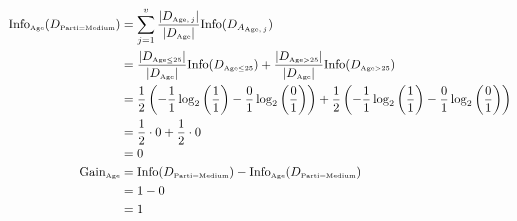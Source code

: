 \documentclass[
english,
smallborders
]{i6prcsht}
\newcommand{\OfSpecificValue}[3]{_{\text{\tiny #1#2#3}}}
\newcommand{\OfAttribute}[1]{_{\text{\tiny #1}}}
\begin{document}
\begin{solution}
\begin{enumerate}
\begin{enumerate}
\begin{enumerate}
\begin{enumerate}
					                        \begin{alignat*}{2}
						                        \text{Info}\OfAttribute{Age}(D\OfSpecificValue{Parti}{=}{Medium}) & = \sum_{j=1}^v \frac{|D\OfAttribute{Age$,j$}|}{|D\OfAttribute{Age}|} \text{Info}(D_{A\OfAttribute{Age$,j$}})                                                                                                                            \\
						                                                                                          & = \frac{|D\OfSpecificValue{Age}{$\leq$}{25}|}{|D\OfAttribute{Age}|} \text{Info}(D\OfSpecificValue{Age}{$\leq$}{25}) + \frac{|D\OfSpecificValue{Age}{$>$}{25}|}{|D\OfAttribute{Age}|} \text{Info}(D\OfSpecificValue{Age}{$>$}{25})       \\
						                                                                                          & = \frac{1}{2} \left(-\frac{1}{1} \log_2\left(\frac{1}{1}\right) - \frac{0}{1} \log_2\left(\frac{0}{1}\right)\right) + \frac{1}{2} \left(-\frac{1}{1} \log_2\left(\frac{1}{1}\right) - \frac{0}{1} \log_2\left(\frac{0}{1}\right)\right) \\
						                                                                                          & = \frac{1}{2} \cdot 0 + \frac{1}{2} \cdot 0                                                                                                                                                                                             \\
						                                                                                          & = 0                                                                                                                                                                                                                                     \\
						                        \text{Gain}\OfAttribute{Age}                                      & = \text{Info}(D\OfSpecificValue{Parti}{=}{Medium}) - \text{Info}\OfAttribute{Age}(D\OfSpecificValue{Parti}{=}{Medium})                                                                                                                  \\
						                                                                                          & = 1 - 0                                                                                                                                                                                                                                 \\
						                                                                                          & = 1                                                                                                                                                                                                                                     \\
					                        \end{alignat*}
					                        

\end{enumerate}
\end{enumerate}
\end{enumerate}
\end{enumerate}
\end{solution}
\end{document}
